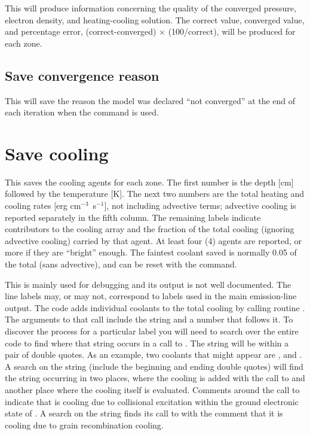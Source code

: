 This will produce information concerning the quality of the converged
pressure, electron density, and heating-cooling solution.  The correct value,
converged value, and percentage error, (correct-converged) $\times$ (100/correct), will be produced for each zone.

\subsection{Save convergence reason}

This will save the reason the model was declared ``not converged'' at
the end of each iteration when the
 command is used.

\section{Save cooling}

This saves the cooling agents for each zone.  The first number is the
depth [cm] followed by the temperature [K].  The next two numbers are the
total heating and cooling rates [erg cm$^{-3}$~s$^{-1}$], not including
advective terms; advective cooling is reported separately in the fifth column.
The remaining labels indicate contributors to the cooling array and the
fraction of the total cooling (ignoring advective cooling) carried by that agent.
At least four (4) agents are reported, or more if they are ``bright'' enough.
The faintest coolant saved is normally 0.05 of the total (sans advective),
and can be reset with the  command.

This is mainly used for debugging and its output is not well documented.
The line labels may, or may not, correspond to labels used in the main
emission-line output.  The code adds individual coolants to the total cooling
by calling routine .
The arguments to that call include the string
and a number that follows it.   To discover the process for a particular
label you will need to search over the entire code to find where that string
occurs in a call to .
The string will be within a pair of double
quotes.
As an example, two coolants that might appear are
, and .  A search on the string  (include the beginning and ending double
quotes) will find the string occurring in two places, where the cooling
is added with the call to  and another place where the cooling itself
is evaluated.  Comments around the call to 
indicate that  is
cooling due to collisional excitation within the ground electronic state
of \htwo.   A search on the string  finds its call to
 with
the comment that it is cooling due to grain recombination cooling.

